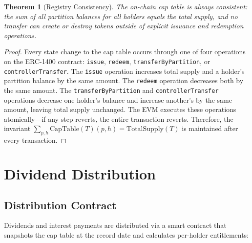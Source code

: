 \documentclass[11pt,a4paper]{article}
\newtheorem{theorem}{Theorem}
\begin{document}
\begin{theorem}[Registry Consistency]
The on-chain cap table is always consistent: the sum of all partition balances for all holders equals the total supply, and no transfer can create or destroy tokens outside of explicit issuance and redemption operations.
\end{theorem}

\begin{proof}
Every state change to the cap table occurs through one of four operations on the ERC-1400 contract: \texttt{issue}, \texttt{redeem}, \texttt{transferByPartition}, or \texttt{controllerTransfer}. The \texttt{issue} operation increases total supply and a holder's partition balance by the same amount. The \texttt{redeem} operation decreases both by the same amount. The \texttt{transferByPartition} and \texttt{controllerTransfer} operations decrease one holder's balance and increase another's by the same amount, leaving total supply unchanged. The EVM executes these operations atomically---if any step reverts, the entire transaction reverts. Therefore, the invariant $\sum_{p,h} \text{CapTable}(T)(p, h) = \text{TotalSupply}(T)$ is maintained after every transaction.
\end{proof}

\section{Dividend Distribution}\label{sec:dividends}

\subsection{Distribution Contract}

Dividends and interest payments are distributed via a smart contract that snapshots the cap table at the record date and calculates per-holder entitlements:
\end{document}
